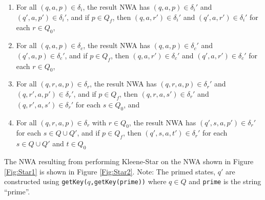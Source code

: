 \begin{enumerate} 

\item For all $(q,a,p) \in \delta_i$, the result NWA has $(q,a,p) \in
  \delta_i'$ and $(q',a,p') \in \delta_i'$, and if $p \in Q_f$, then
  $(q,a,r') \in \delta_i'$ and $(q',a,r') \in \delta_i'$ for each $r \in
  Q_0$,

\item For all $(q,a,p) \in \delta_c$, the result NWA has $(q,a,p) \in
  \delta_c'$ and $(q',a,p) \in \delta_c'$, and if $p \in Q_f$, then $(q,a,r')
  \in \delta_c'$ and $(q',a,r') \in \delta_c'$ for each $r \in Q_0$,

\item For all $(q,r,a,p) \in \delta_r$, the result NWA has $(q,r,a,p) \in
  \delta_r'$ and $(q,r',a,p') \in \delta_r'$, and if $p \in Q_f$, then
  $(q,r,a,s') \in \delta_r'$ and $(q,r',a,s') \in \delta_r'$ for each $s \in
  Q_0$, and

\item For all $(q,r,a,p) \in \delta_r$ with $r \in Q_0$, the result NWA has
  $(q',s,a,p') \in \delta_r'$ for each $s \in Q \cup Q'$, and if $p \in Q_f$,
  then $(q',s,a,t') \in \delta_r'$ for each $s \in Q \cup Q'$ and $t \in Q_0$

\end{enumerate}  

\noindent The NWA resulting from performing Kleene-Star on the NWA shown in
Figure \ref{Fig:Star1} is shown in Figure \ref{Fig:Star2}.  Note: The primed
states, $q'$ are constructed using \texttt{getKey($q$,getKey(prime))} where
$q \in Q$ and \texttt{prime} is the string ``prime''.

